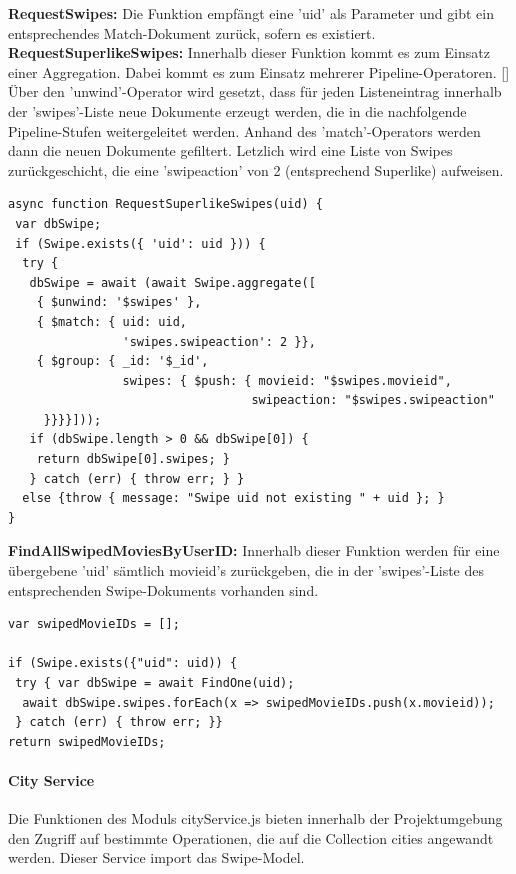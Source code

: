 \noindent
\textbf{RequestSwipes:}
Die Funktion empfängt eine 'uid' als Parameter und gibt ein entsprechendes Match-Dokument zurück, sofern es existiert.\\

\noindent
\textbf{RequestSuperlikeSwipes:}
Innerhalb dieser Funktion kommt es zum Einsatz einer Aggregation. 
Dabei kommt es zum Einsatz mehrerer Pipeline-Operatoren. []
Über den 'unwind'-Operator wird gesetzt, dass für jeden Listeneintrag innerhalb der 'swipes'-Liste neue Dokumente erzeugt werden, die in die nachfolgende Pipeline-Stufen weitergeleitet werden. Anhand des 'match'-Operators werden dann die neuen Dokumente gefiltert. Letzlich wird eine Liste von Swipes zurückgeschicht, die eine 'swipeaction' von 2 (entsprechend Superlike) aufweisen.

\begin{lstlisting}[caption=Swipe Service - RequestSuperlikeSwipes, label=lst:swipeserviceRequestSuperlikeSwipes]
async function RequestSuperlikeSwipes(uid) {
 var dbSwipe;
 if (Swipe.exists({ 'uid': uid })) {
  try {
   dbSwipe = await (await Swipe.aggregate([
    { $unwind: '$swipes' },
    { $match: { uid: uid,
                'swipes.swipeaction': 2 }},
    { $group: { _id: '$_id',
                swipes: { $push: { movieid: "$swipes.movieid",
                                  swipeaction: "$swipes.swipeaction" 
     }}}}]));
   if (dbSwipe.length > 0 && dbSwipe[0]) {
    return dbSwipe[0].swipes; }
   } catch (err) { throw err; } }
  else {throw { message: "Swipe uid not existing " + uid }; }
}
\end{lstlisting}

\noindent
\textbf{FindAllSwipedMoviesByUserID:}
Innerhalb dieser Funktion werden für eine übergebene 'uid' sämtlich movieid's zurückgeben, die in der 'swipes'-Liste des entsprechenden Swipe-Dokuments vorhanden sind.

\begin{lstlisting}[caption=Swipe Service - FindAllSwipedMoviesByUserID, label=lst:swipeserviceFindAllSwipedMoviesByUserID]
var swipedMovieIDs = [];
    
if (Swipe.exists({"uid": uid)) {
 try { var dbSwipe = await FindOne(uid);
  await dbSwipe.swipes.forEach(x => swipedMovieIDs.push(x.movieid));
 } catch (err) { throw err; }}
return swipedMovieIDs;
\end{lstlisting}


%
%
\paragraph{City Service}
Die Funktionen des Moduls cityService.js bieten innerhalb der Projektumgebung den Zugriff auf bestimmte Operationen, die auf die Collection cities angewandt werden. Dieser Service import das Swipe-Model.\\

